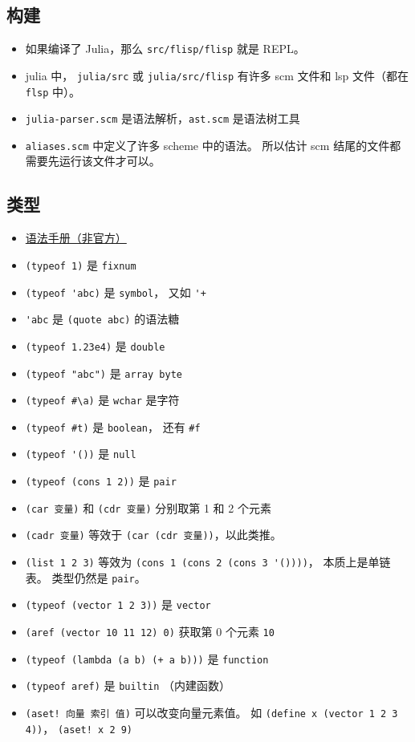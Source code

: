 
\subsection{构建}
\begin{itemize}
\item 如果编译了 Julia，那么 \verb`src/flisp/flisp` 就是 REPL。
\item julia 中， \verb`julia/src` 或 \verb`julia/src/flisp` 有许多 scm 文件和 lsp 文件（都在 \verb`flsp` 中）。
\item \verb`julia-parser.scm` 是语法解析，\verb`ast.scm` 是语法树工具
\item \verb`aliases.scm` 中定义了许多 scheme 中的语法。 所以估计 scm 结尾的文件都需要先运行该文件才可以。
\end{itemize}


\subsection{类型}
\begin{itemize}
\item \href{https://code.google.com/archive/p/femtolisp/wikis/Manual.wiki}{语法手册（非官方）}
\item \verb`(typeof 1)` 是 \verb`fixnum`
\item \verb`(typeof 'abc)` 是 \verb`symbol`， 又如 \verb`'+`
\item \verb`'abc` 是 \verb`(quote abc)` 的语法糖
\item \verb`(typeof 1.23e4)` 是 \verb`double`
\item \verb`(typeof "abc")` 是 \verb`array byte`
\item \verb`(typeof #\a)` 是 \verb`wchar` 是字符
\item \verb`(typeof #t)` 是 \verb`boolean`， 还有 \verb`#f`
\item \verb`(typeof '())` 是 \verb`null`
\item \verb`(typeof (cons 1 2))` 是 \verb`pair`
\item \verb`(car 变量)` 和 \verb`(cdr 变量)` 分别取第 1 和 2 个元素
\item \verb`(cadr 变量)` 等效于 \verb`(car (cdr 变量))`，以此类推。
\item \verb`(list 1 2 3)` 等效为 \verb`(cons 1 (cons 2 (cons 3 '())))`， 本质上是单链表。 类型仍然是 \verb`pair`。
\item \verb`(typeof (vector 1 2 3))` 是 \verb`vector`
\item \verb`(aref (vector 10 11 12) 0)` 获取第 0 个元素 \verb`10`
\item \verb`(typeof (lambda (a b) (+ a b)))` 是 \verb`function`
\item \verb`(typeof aref)` 是 \verb`builtin` （内建函数）
\item \verb`(aset! 向量 索引 值)` 可以改变向量元素值。 如 \verb`(define x (vector 1 2 3 4))`， \verb`(aset! x 2 9)`
\end{itemize}

